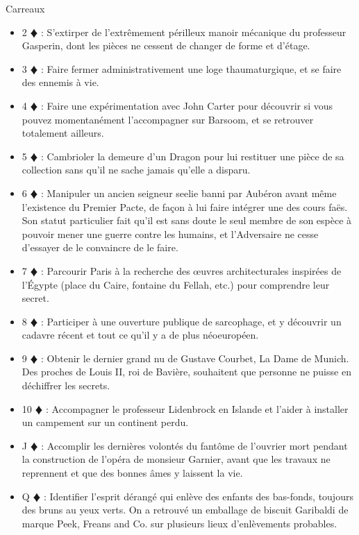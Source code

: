 \documentclass[a5paper,pagesize,french]{book}
\begin{document}
Carreaux
\begin{itemize}
	\item[] 2{\color{red} $\vardiamond$ } : S'extirper de l'extrêmement périlleux manoir mécanique du professeur Gasperin, dont les pièces ne cessent de changer de forme et d'étage.
	\item[] 3{\color{red} $\vardiamond$ } : Faire fermer administrativement une loge thaumaturgique, et se faire des ennemis à vie.
	\item[] 4{\color{red} $\vardiamond$ } : Faire une expérimentation avec John Carter pour découvrir si vous pouvez momentanément l'accompagner sur Barsoom, et se retrouver totalement ailleurs.
	\item[] 5{\color{red} $\vardiamond$ } : Cambrioler la demeure d'un Dragon pour lui restituer une pièce de sa collection sans qu'il ne sache jamais qu'elle a disparu.
	\item[] 6{\color{red} $\vardiamond$ } : Manipuler un ancien seigneur seelie banni par Aubéron avant même l'existence du Premier Pacte, de façon à lui faire intégrer une des cours faës. Son statut particulier fait qu'il est sans doute le seul membre de son espèce à pouvoir mener une guerre contre les humains, et l'Adversaire ne cesse d'essayer de le convaincre de le faire.
	\item[] 7{\color{red} $\vardiamond$ } : Parcourir Paris à la recherche des œuvres architecturales inspirées de l'Égypte (place du Caire, fontaine du Fellah, etc.) pour comprendre leur secret. 
	\item[] 8{\color{red} $\vardiamond$ } : Participer à une ouverture publique de sarcophage, et y découvrir un cadavre récent et tout ce qu'il y a de plus néoeuropéen. 
	\item[] 9{\color{red} $\vardiamond$ } : Obtenir le dernier grand nu de Gustave Courbet, La Dame de Munich. Des proches de Louis II, roi de Bavière, souhaitent que personne ne puisse en déchiffrer les secrets.
	\item[] 10{\color{red} $\vardiamond$ } : Accompagner le professeur Lidenbrock en Islande et l'aider à installer un campement sur un continent perdu.
	\item[] J{\color{red} $\vardiamond$ } : Accomplir les dernières volontés du fantôme de l'ouvrier mort pendant la construction de l'opéra de monsieur Garnier, avant que les travaux ne reprennent et que des bonnes âmes y laissent la vie. 
	\item[] Q{\color{red} $\vardiamond$ } : Identifier l'esprit dérangé qui enlève des enfants des bas-fonds, toujours des bruns au yeux verts. On a retrouvé un emballage de biscuit Garibaldi de marque Peek, Freans and Co. sur plusieurs lieux d'enlèvements probables.

\end{itemize}
\end{document}
